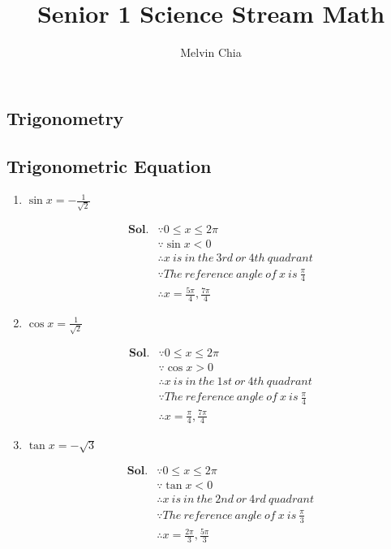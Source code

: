 \documentclass{report}
\title{Senior 1 Science Stream Math}
\author{Melvin Chia}
\begin{document}
\maketitle

\begin{multicols}{2}
\chapter{Trigonometry}

\section{Trigonometric Equation}

\begin{enumerate}

\item $\sin x = -\frac{1}{\sqrt{2}}$

\begin{align*}
\textbf{Sol.}&\because 0 \leq x \leq 2\pi \\
&\because \sin x < 0 \\
&\therefore x\ is\ in\ the\ 3rd\ or\ 4th\ quadrant \\
&\because The\ reference\ angle\ of \ x \ is \ \frac{\pi}{4} \\
&\therefore x = \frac{5\pi}{4}, \frac{7\pi}{4}
\end{align*}

\item $\cos x = \frac{1}{\sqrt{2}}$

\begin{align*}
\textbf{Sol.}&\because 0 \leq x \leq 2\pi \\
&\because \cos x > 0 \\
&\therefore x\ is\ in\ the\ 1st\ or\ 4th\ quadrant \\
&\because The\ reference\ angle\ of \ x \ is \ \frac{\pi}{4} \\
&\therefore x = \frac{\pi}{4}, \frac{7\pi}{4}
\end{align*}

\item $\tan x = -\sqrt{3}$

\begin{align*}
\textbf{Sol.}&\because 0 \leq x \leq 2\pi \\
&\because \tan x < 0 \\
&\therefore x\ is\ in\ the\ 2nd\ or\ 4rd\ quadrant \\
&\because The\ reference\ angle\ of \ x \ is \ \frac{\pi}{3} \\
&\therefore x = \frac{2\pi}{3}, \frac{5\pi}{3}
\end{align*}


\end{enumerate}
\end{multicols}
\end{document}
